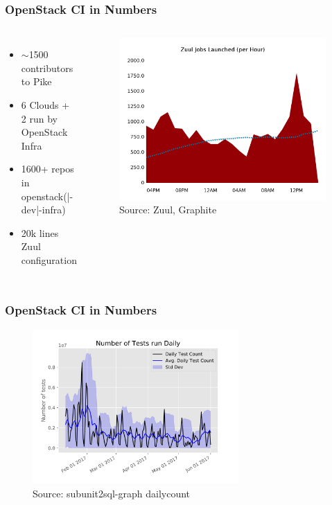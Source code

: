 \documentclass[aspectratio=169,11pt,hyperref={colorlinks=true}]{beamer}
\begin{document}
\begin{frame}
    \frametitle{OpenStack CI in Numbers}
       \begin{columns}
    \begin{itemize}
        \item{$\sim$1500 contributors to Pike}
        \item{6 Clouds + 2 run by OpenStack Infra}
        \item{1600+ repos in openstack(|-dev|-infra)}
        \item{20k lines Zuul configuration}
    \end{itemize}
    \begin{figure}
    \begin{center}
    	\includegraphics[width=1\textwidth]{zuul_all_jobs.png}
         \caption{Source: Zuul, Graphite}
    \end{center}
    \end{figure}
       \end{columns}
\end{frame}

\begin{frame}
    \frametitle{OpenStack CI in Numbers}
    \begin{figure}
    \begin{center}
    	\includegraphics[width=0.7\textwidth]{daily_count.png}
         \caption{Source: subunit2sql-graph dailycount}
    \end{center}
    \end{figure}
\end{frame}
\end{document}
